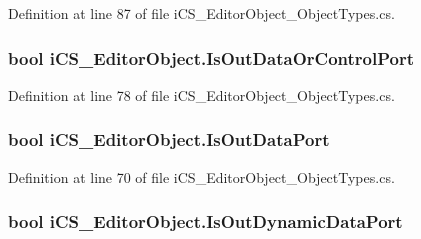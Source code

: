 Definition at line 87 of file i\+C\+S\+\_\+\+Editor\+Object\+\_\+\+Object\+Types.\+cs.

\hypertarget{classi_c_s___editor_object_a78b1d5bbc3029b73607e403d412b09b6}{
\subsubsection[{Is\+Out\+Data\+Or\+Control\+Port}]{\setlength{\rightskip}{0pt plus 5cm}bool i\+C\+S\+\_\+\+Editor\+Object.\+Is\+Out\+Data\+Or\+Control\+Port\hspace{0.3cm}{\ttfamily [get]}}}\label{classi_c_s___editor_object_a78b1d5bbc3029b73607e403d412b09b6}


Definition at line 78 of file i\+C\+S\+\_\+\+Editor\+Object\+\_\+\+Object\+Types.\+cs.

\hypertarget{classi_c_s___editor_object_a2d4ba645941bd214f07a9554846fe7e0}{
\subsubsection[{Is\+Out\+Data\+Port}]{\setlength{\rightskip}{0pt plus 5cm}bool i\+C\+S\+\_\+\+Editor\+Object.\+Is\+Out\+Data\+Port\hspace{0.3cm}{\ttfamily [get]}}}\label{classi_c_s___editor_object_a2d4ba645941bd214f07a9554846fe7e0}


Definition at line 70 of file i\+C\+S\+\_\+\+Editor\+Object\+\_\+\+Object\+Types.\+cs.

\hypertarget{classi_c_s___editor_object_a3b57ef602801dd4ae3dc9898c3168598}{
\subsubsection[{Is\+Out\+Dynamic\+Data\+Port}]{\setlength{\rightskip}{0pt plus 5cm}bool i\+C\+S\+\_\+\+Editor\+Object.\+Is\+Out\+Dynamic\+Data\+Port\hspace{0.3cm}{\ttfamily [get]}}}\label{classi_c_s___editor_object_a3b57ef602801dd4ae3dc9898c3168598}


